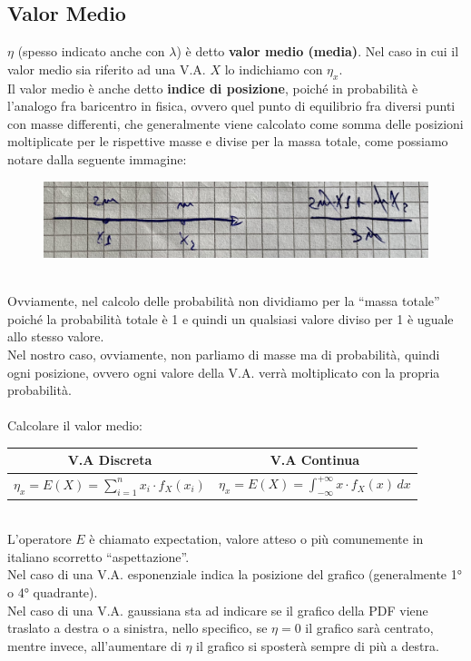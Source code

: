 \documentclass{article}
\begin{document}
\subsection{Valor Medio}
$\eta$ (spesso indicato anche con $\lambda$) è detto \textbf{valor medio (media)}. 
Nel caso in cui il valor medio sia riferito ad una V.A. $X$ lo indichiamo con $\eta_x$. \\
Il valor medio è anche detto \textbf{indice di posizione}, poiché in probabilità è l’analogo fra baricentro in fisica, ovvero quel punto di equilibrio fra diversi punti con masse differenti, che generalmente viene calcolato come somma delle posizioni moltiplicate per le rispettive masse e divise per la massa totale, come possiamo notare dalla seguente immagine:
\begin{figure}[ht]
\centering
\includegraphics[scale=0.13]{images/45.VM_Baricentro.jpeg}
\end{figure} ~\\
Ovviamente, nel calcolo delle probabilità non dividiamo per la “massa totale” poiché la probabilità totale è 1 e quindi un qualsiasi valore diviso per 1 è uguale allo stesso valore. \\ 
Nel nostro caso, ovviamente, non parliamo di masse ma di probabilità, quindi ogni posizione, ovvero ogni valore della V.A. verrà moltiplicato con la propria probabilità. \\ \\
Calcolare il valor medio:
\begin{table} [ht]
    \centering
    \begin{tabular}{|c|c|}
         \hline
         V.A Discreta & V.A Continua\\
         \hline 
         $\eta_x = E(X) = \sum_{i=1}^{n}x_i \cdot f_X(x_i) $ & $\eta_x = E(X) = \int_{- \infty}^{+\infty}x \cdot f_X(x) \,dx $ \\
         \hline
    \end{tabular}
\end{table} \\
L’operatore $E$ è chiamato expectation, valore atteso o più comunemente in italiano scorretto “aspettazione”. \\
Nel caso di una V.A. esponenziale indica la posizione del grafico (generalmente 1° o 4° quadrante). \\
Nel caso di una V.A. gaussiana sta ad indicare se il grafico della PDF viene traslato a destra o a sinistra, nello specifico, se $\eta = 0$ il grafico sarà centrato, mentre invece, all’aumentare di $\eta$ il grafico si sposterà sempre di più a destra.
\end{document}
